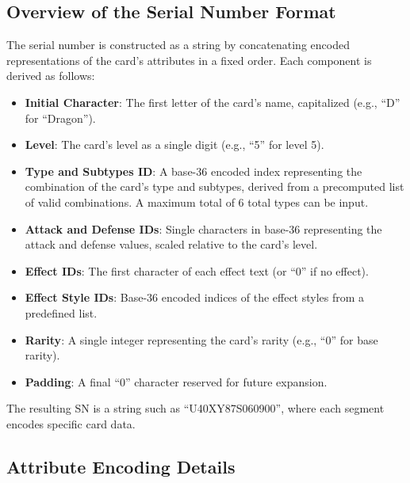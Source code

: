 \subsection{Overview of the Serial Number Format}
The serial number is constructed as a string by concatenating encoded representations of the card's attributes in a fixed order. Each component is derived as follows:
\begin{itemize}
	\item \textbf{Initial Character}: The first letter of the card's name, capitalized (e.g., ``D'' for ``Dragon'').
	\item \textbf{Level}: The card's level as a single digit (e.g., ``5'' for level 5).
	\item \textbf{Type and Subtypes ID}: A base-36 encoded index representing the combination of the card's type and subtypes, derived from a precomputed list of valid combinations. A maximum total of 6 total types can be input.
	\item \textbf{Attack and Defense IDs}: Single characters in base-36 representing the attack and defense values, scaled relative to the card's level.
	\item \textbf{Effect IDs}: The first character of each effect text (or ``0'' if no effect).
	\item \textbf{Effect Style IDs}: Base-36 encoded indices of the effect styles from a predefined list.
	\item \textbf{Rarity}: A single integer representing the card's rarity (e.g., ``0'' for base rarity).
	\item \textbf{Padding}: A final ``0'' character reserved for future expansion.
\end{itemize}
The resulting SN is a string such as ``U40XY87S060900'', where each segment encodes specific card data.

\subsection{Attribute Encoding Details}
